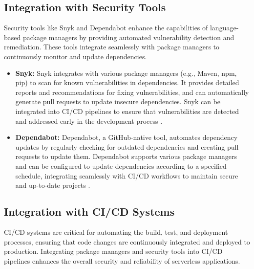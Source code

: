 \documentclass[sigconf]{acmart}
\begin{document}
\subsection{Integration with Security Tools}

Security tools like Snyk and Dependabot enhance the capabilities of language-based package managers by providing automated vulnerability detection and remediation. These tools integrate seamlessly with package managers to continuously monitor and update dependencies.

\begin{itemize}
    \item \textbf{Snyk:} Snyk integrates with various package managers (e.g., Maven, npm, pip) to scan for known vulnerabilities in dependencies. It provides detailed reports and recommendations for fixing vulnerabilities, and can automatically generate pull requests to update insecure dependencies. Snyk can be integrated into CI/CD pipelines to ensure that vulnerabilities are detected and addressed early in the development process \cite{snykIntegration2023}.
    \item \textbf{Dependabot:} Dependabot, a GitHub-native tool, automates dependency updates by regularly checking for outdated dependencies and creating pull requests to update them. Dependabot supports various package managers and can be configured to update dependencies according to a specified schedule, integrating seamlessly with CI/CD workflows to maintain secure and up-to-date projects \cite{dependabot2023}.
\end{itemize}

\subsection{Integration with CI/CD Systems}

CI/CD systems are critical for automating the build, test, and deployment processes, ensuring that code changes are continuously integrated and deployed to production. Integrating package managers and security tools into CI/CD pipelines enhances the overall security and reliability of serverless applications.
\end{document}

